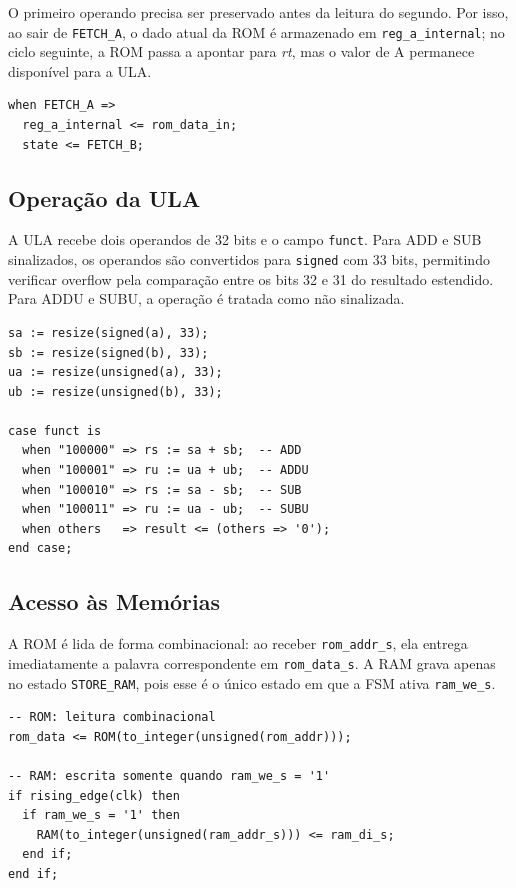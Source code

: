\documentclass[conference]{IEEEtran}
\begin{document}
O primeiro operando precisa ser preservado antes da leitura do segundo. Por isso, ao sair de \texttt{FETCH\_A}, o dado atual da ROM é armazenado em \texttt{reg\_a\_internal}; no ciclo seguinte, a ROM passa a apontar para \textit{rt}, mas o valor de A permanece disponível para a ULA.

\begin{lstlisting}[caption={Captura do operando A antes da leitura de B}]
when FETCH_A =>
  reg_a_internal <= rom_data_in;
  state <= FETCH_B;
\end{lstlisting}

\subsection{Operação da ULA}
A ULA recebe dois operandos de 32 bits e o campo \texttt{funct}. Para ADD e SUB sinalizados, os operandos são convertidos para \texttt{signed} com 33 bits, permitindo verificar overflow pela comparação entre os bits 32 e 31 do resultado estendido. Para ADDU e SUBU, a operação é tratada como não sinalizada.

\begin{lstlisting}[caption={Seleção da operação aritmética pelo campo funct},label={lst:ulasnippet}]
sa := resize(signed(a), 33);
sb := resize(signed(b), 33);
ua := resize(unsigned(a), 33);
ub := resize(unsigned(b), 33);

case funct is
  when "100000" => rs := sa + sb;  -- ADD
  when "100001" => ru := ua + ub;  -- ADDU
  when "100010" => rs := sa - sb;  -- SUB
  when "100011" => ru := ua - ub;  -- SUBU
  when others   => result <= (others => '0');
end case;
\end{lstlisting}

\subsection{Acesso às Memórias}
A ROM é lida de forma combinacional: ao receber \texttt{rom\_addr\_s}, ela entrega imediatamente a palavra correspondente em \texttt{rom\_data\_s}. A RAM grava apenas no estado \texttt{STORE\_RAM}, pois esse é o único estado em que a FSM ativa \texttt{ram\_we\_s}.

\begin{lstlisting}[caption={Leitura da ROM e escrita síncrona da RAM}]
-- ROM: leitura combinacional
rom_data <= ROM(to_integer(unsigned(rom_addr)));

-- RAM: escrita somente quando ram_we_s = '1'
if rising_edge(clk) then
  if ram_we_s = '1' then
    RAM(to_integer(unsigned(ram_addr_s))) <= ram_di_s;
  end if;
end if;
\end{lstlisting}
\end{document}
